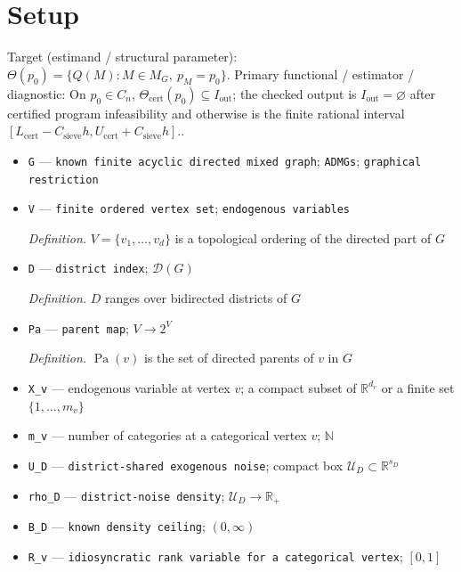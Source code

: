 \documentclass{article}
\begin{document}
\section{Setup}

Target (estimand / structural parameter): \(\Theta(p_0)=\{Q(M):M\in M_G,\ p_M=p_0\}\).
Primary functional / estimator / diagnostic: On \(p_0\in C_n\), \(\Theta_{\mathrm{cert}}(p_0)\subseteq I_{\mathrm{out}}\); the checked output is \(I_{\mathrm{out}}=\varnothing\) after certified program infeasibility and otherwise is the finite rational interval \([L_{\mathrm{cert}}-C_{\mathrm{sieve}}h,U_{\mathrm{cert}}+C_{\mathrm{sieve}}h]\)..
\begin{itemize}
  \item \texttt{G} --- \texttt{known finite acyclic directed mixed graph}; \texttt{ADMGs}; \texttt{graphical restriction}
  \item \texttt{V} --- \texttt{finite ordered vertex set}; \texttt{endogenous variables}
  \par\smallskip\noindent\emph{Definition.} \(V=\{v_1,\ldots,v_d\}\) is a topological ordering of the directed part of \(G\)
  \item \texttt{D} --- \texttt{district index}; \(\mathcal D(G)\)
  \par\smallskip\noindent\emph{Definition.} \(D\) ranges over bidirected districts of \(G\)
  \item \texttt{Pa} --- \texttt{parent map}; \(V\to 2^V\)
  \par\smallskip\noindent\emph{Definition.} \(\operatorname{Pa}(v)\) is the set of directed parents of \(v\) in \(G\)
  \item \texttt{X\_\allowbreak{}v} --- endogenous variable at vertex \(v\); a compact subset of \(\mathbb R^{d_v}\) or a finite set \(\{1,\ldots,m_v\}\)
  \item \texttt{m\_\allowbreak{}v} --- number of categories at a categorical vertex \(v\); \(\mathbb N\)
  \item \texttt{U\_\allowbreak{}D} --- \texttt{district-\allowbreak{}shared exogenous noise}; compact box \(\mathcal U_D\subset\mathbb R^{s_D}\)
  \item \texttt{rho\_\allowbreak{}D} --- \texttt{district-\allowbreak{}noise density}; \(\mathcal U_D\to\mathbb R_+\)
  \item \texttt{B\_\allowbreak{}D} --- \texttt{known density ceiling}; \((0,\infty)\)
  \item \texttt{R\_\allowbreak{}v} --- \texttt{idiosyncratic rank variable for a categorical vertex}; \([0,1]\)

\end{itemize}
\end{document}
